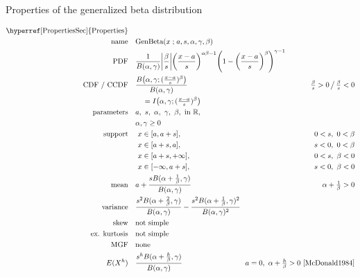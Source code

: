 

\begin{table*}[tp]
\caption[Generalized beta distribution -- Properties]{Properties of the generalized beta distribution}
 \begin{align*}
 \text{\hyperref[PropertiesSec]{Properties}}  \quad& \\
\text{name} \quad & \text{GenBeta}(x\given a,s,\alpha, \gamma,\beta) 
\\
\text{PDF}\quad &   \frac{1}{B(\alpha, \gamma)} \Left|\frac{\beta}{s}\Right|
\Left(\frac{x-a}{s} \Right)^{\alpha \beta -1} \Left(1-\Left(\frac{x-a}{s}\Right)^\beta\Right)^{\gamma -1}
\checked
\hspace{-8em}
\\
\text{CDF / CCDF} \quad  &   \frac{B\Left( \alpha,\gamma; (\tfrac{x-a}{s})^\beta  \Right)}{B(\alpha,\gamma)}
\checked
& \tfrac{\beta}{s} >0 \,\big/ \, \tfrac{\beta}{s} <0
\\ & \quad = I\Left(  \alpha,\gamma; (\tfrac{x-a}{s})^\beta \Right) \checked
\\ 
\text{parameters}\quad &   a,\ s,\ \alpha,\ \gamma,\ \beta, \text{ in } \Real, \\ &  \alpha,\gamma\geq0
\\
\text{support} \quad 
&   \ x \in [a,a+s],  \quad & 0<s,\ 0<\beta  \checked
 \\ 	 		 & \ x\in[a+s,a],  \quad & s<0,\ 0<\beta   \checked
 \\  			 & \ x\in[a+s,+\infty], \quad  & 0<s,\ \beta<0  \checked
 \\  			& \ x\in[-\infty,a+s], \quad & s<0,\ \beta<0 \checked
\\
\text{mean} \quad  &   a+ \frac{s B(\alpha+\tfrac{1}{\beta},\gamma) }{B(\alpha,\gamma)}  \quad & \alpha+\tfrac{1}{\beta} >0
\checked
\\
\text{variance} \quad  & \frac{s^2 B(\alpha+\tfrac{2}{\beta},\gamma) }{B(\alpha,\gamma)} -\frac{s^2 B(\alpha+\tfrac{1}{\beta},\gamma)^2 }{B(\alpha,\gamma)^2} \checked
\\
\text{skew} \quad  &   \text{not simple}
\\
\text{ex. kurtosis} \quad  &   \text{not simple}
\\
\text{MGF} \quad  &  \text{none} %
\\
E(X^h) \quad & \frac{s^h B(\alpha+\tfrac{h}{\beta},\gamma) }{B(\alpha,\gamma)}  \qquad  & \!\!a=0,\ \alpha+\tfrac{h}{\beta} >0
\ \text{\cite{McDonald1984}} \checked
\end{align*}
\end{table*}

